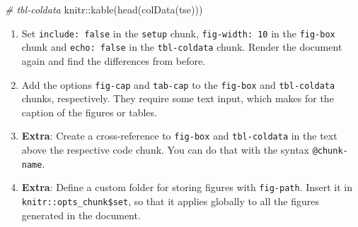 \documentclass[
]{book}
\newenvironment{Shaded}{\begin{snugshade}}{\end{snugshade}}
\newcommand{\AttributeTok}[1]{\textcolor[rgb]{0.77,0.63,0.00}{#1}}
\newcommand{\CommentTok}[1]{\textcolor[rgb]{0.56,0.35,0.01}{\textit{#1}}}
\newcommand{\ConstantTok}[1]{\textcolor[rgb]{0.00,0.00,0.00}{#1}}
\newcommand{\FunctionTok}[1]{\textcolor[rgb]{0.00,0.00,0.00}{#1}}
\newcommand{\NormalTok}[1]{#1}
\newcommand{\OtherTok}[1]{\textcolor[rgb]{0.56,0.35,0.01}{#1}}
\newcommand{\SpecialCharTok}[1]{\textcolor[rgb]{0.00,0.00,0.00}{#1}}
\newcommand{\StringTok}[1]{\textcolor[rgb]{0.31,0.60,0.02}{#1}}
\providecommand{\tightlist}{%
  \setlength{\itemsep}{0pt}\setlength{\parskip}{0pt}}
\begin{document}
\begin{Shaded}
\end{Shaded}

\begin{Shaded}
\end{Shaded}

\begin{Shaded}
\begin{Highlighting}[]
\CommentTok{\# tbl{-}coldata}
\NormalTok{knitr}\SpecialCharTok{::}\FunctionTok{kable}\NormalTok{(}\FunctionTok{head}\NormalTok{(}\FunctionTok{colData}\NormalTok{(tse)))}
\end{Highlighting}
\end{Shaded}

\begin{enumerate}
\def\labelenumi{\arabic{enumi}.}
\setcounter{enumi}{3}
\tightlist
\item
  Set \texttt{include:\ false} in the \texttt{setup} chunk, \texttt{fig-width:\ 10} in the \texttt{fig-box}
  chunk and \texttt{echo:\ false} in the \texttt{tbl-coldata} chunk. Render the document again
  and find the differences from before.
\item
  Add the options \texttt{fig-cap} and \texttt{tab-cap} to the \texttt{fig-box} and \texttt{tbl-coldata}
  chunks, respectively. They require some text input, which makes for the
  caption of the figures or tables.
\item
  \textbf{Extra}: Create a cross-reference to \texttt{fig-box} and \texttt{tbl-coldata} in the
  text above the respective code chunk. You can do that with the syntax
  \texttt{@chunk-name}.
\item
  \textbf{Extra}: Define a custom folder for storing figures with \texttt{fig-path}. Insert
  it in \texttt{knitr::opts\_chunk\$set}, so that it applies globally to all the figures
  generated in the document.
\end{enumerate}
\end{document}
